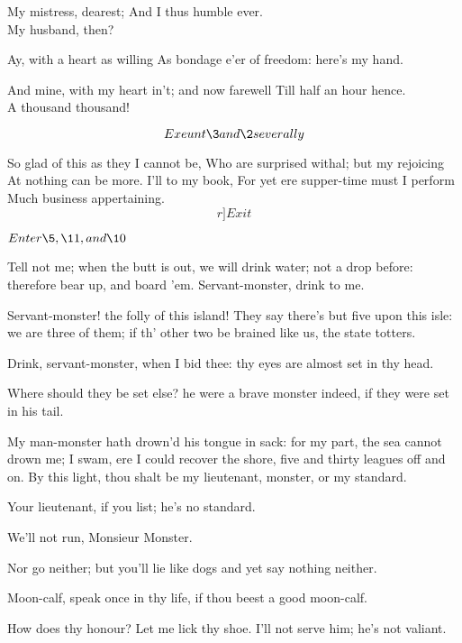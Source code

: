 \documentclass[11pt]{book}
\begin{document}
\3	My mistress, dearest;
	And I thus humble ever.   \\

\2	My husband, then?

\3	Ay, with a heart as willing
	As bondage e'er of freedom: here's my hand.

\2	And mine, with my heart in't; and now farewell
	Till half an hour hence. \\

\3	A thousand thousand!

	\[Exeunt \3 and \2 severally\]

\1	So glad of this as they I cannot be,
	Who are surprised withal; but my rejoicing
	At nothing can be more. I'll to my book,
	For yet ere supper-time must I perform
	Much business appertaining. \[r]Exit\]


\begin{PROSE}


	\(Enter \5, \11, and \10\)

	Tell not me; when the butt is out, we will drink
	water; not a drop before: therefore bear up, and
	board 'em. Servant-monster, drink to me.

	Servant-monster! the folly of this island! They
	say there's but five upon this isle: we are three
	of them; if th' other two be brained like us, the
	state totters.

	Drink, servant-monster, when I bid thee: thy eyes
	are almost set in thy head.

	Where should they be set else? he were a brave
	monster indeed, if they were set in his tail.

	My man-monster hath drown'd his tongue in sack:
	for my part, the sea cannot drown me; I swam, ere I
	could recover the shore, five and thirty leagues off
	and on. By this light, thou shalt be my lieutenant,
	monster, or my standard.

	Your lieutenant, if you list; he's no standard.

	We'll not run, Monsieur Monster.

	Nor go neither; but you'll lie like dogs and yet say
	nothing neither.

	Moon-calf, speak once in thy life, if thou beest a
	good moon-calf.

\end{PROSE}

\5	How does thy honour? Let me lick thy shoe.
	I'll not serve him; he's not valiant.
\end{document}
